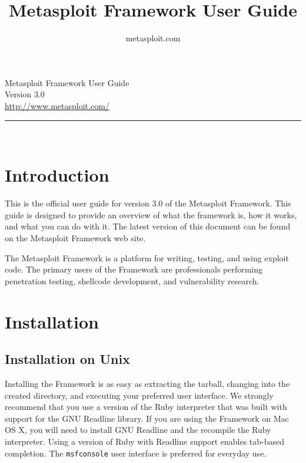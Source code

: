 \documentclass{report}
\begin{document}
\title{Metasploit Framework User Guide}
\author{metasploit.com}

\begin{titlepage}
    \begin{center}
        		
        \huge{Metasploit Framework User Guide}
		\ \\[10mm]
		\large{Version 3.0}
		\\[120mm]
		
        \small{\url{http://www.metasploit.com/}}

        \rule{10cm}{1pt} \\[4mm]
        \renewcommand{\arraystretch}{0.5}
    \end{center}
\end{titlepage}

\tableofcontents

\setlength{\parindent}{0pt} \setlength{\parskip}{8pt}


\chapter{Introduction}

\par
This is the official user guide for version 3.0 of the Metasploit Framework. This 
guide is designed to provide an overview of what the framework is, how it works,
and what you can do with it. The latest version of this document can be found
on the Metasploit Framework web site. 

\par
The Metasploit Framework is a platform for writing, testing, and using exploit code.
The primary users of the Framework are professionals performing penetration testing,
shellcode development, and vulnerability research.

\par
\pagebreak

\chapter{Installation}

    \section{Installation on Unix}
    \label{INSTALL-UNIX}
\par
Installing the Framework is as easy as extracting the tarball, changing into the
created directory, and executing your preferred user interface. We strongly
recommend that you use a version of the Ruby interpreter that was built with
support for the GNU Readline library. If you are using the Framework on Mac OS
X, you will need to install GNU Readline and the recompile the Ruby
interpreter.  Using a version of Ruby with Readline support enables tab-based
completion.  The \texttt{msfconsole} user interface is preferred for everyday
use.
\end{document}
